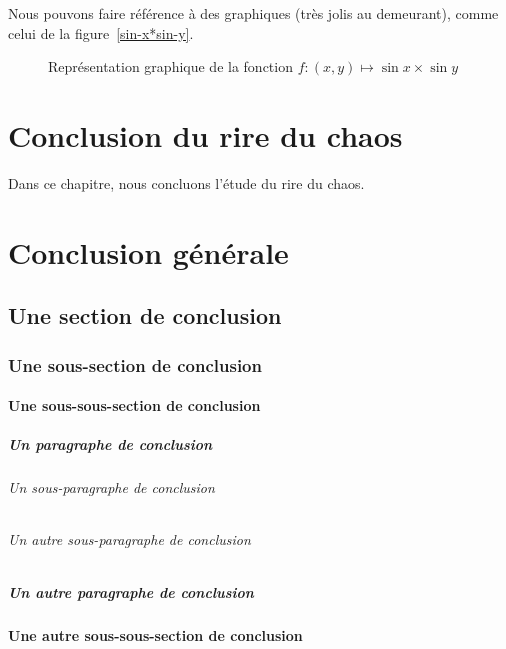 \documentclass[12pt,version=final,space=onehalf,localtocs,localbibs]{yathesis}
\begin{document}
Nous pouvons faire référence à des graphiques (très jolis au demeurant), comme
celui de la figure~\vref{sin-x*sin-y}.
\lipsum[3-10]
\begin{figure}[ht]
  \centering
  \capstart
  \caption{Représentation graphique de la fonction $f:(x,y)\mapsto
    \sin x\times\sin y$}
  \label{sin-x*sin-y}
\end{figure}
%
\chapter{Conclusion du rire du chaos}
Dans ce chapitre, nous concluons l'étude du rire du chaos.

\lipsum[6-9]
%
\chapter*{Conclusion générale}
\lipsum[26-27]
\section{Une section de conclusion}
\lipsum[28-29]
\subsection{Une sous-section de conclusion}
\lipsum[29-31]
\subsubsection{Une sous-sous-section de conclusion}
\lipsum[31-35]
\paragraph{Un paragraphe de conclusion}
\lipsum[36-38]
\subparagraph{Un sous-paragraphe de conclusion}
\lipsum[39-41]
\subparagraph{Un autre sous-paragraphe de conclusion}
\lipsum[39-41]
\paragraph{Un autre paragraphe de conclusion}
\lipsum[36-38]
\subsubsection{Une autre sous-sous-section de conclusion}
\lipsum[31-37]
\end{document}
